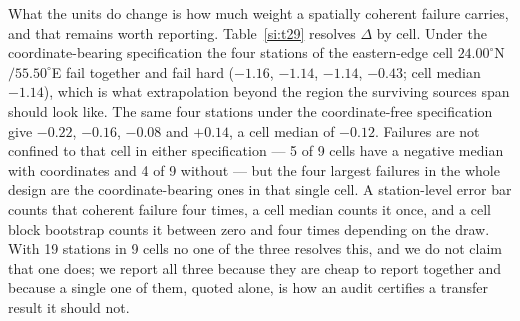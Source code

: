 \documentclass[11pt]{article}
\begin{document}
What the units do change is how much weight a spatially coherent failure carries, and that
remains worth reporting. Table~\ref{si:t29} resolves $\Delta$ by cell. Under the coordinate-bearing
specification the four stations of the eastern-edge cell $24.00^\circ$N$/55.50^\circ$E fail
together and fail hard ($-1.16$, $-1.14$, $-1.14$, $-0.43$; cell median $-1.14$), which is
what extrapolation beyond the region the surviving sources span should look like. The same
four stations under the coordinate-free specification give $-0.22$, $-0.16$, $-0.08$ and
$+0.14$, a cell median of $-0.12$. Failures are not confined to that cell in either
specification --- 5 of 9 cells have a negative median with coordinates and 4 of 9 without
--- but the four largest failures in the whole design are the coordinate-bearing ones in
that single cell. A station-level error bar counts that coherent failure four times, a
cell median counts it once, and a cell block bootstrap counts it between zero and four
times depending on the draw. With 19 stations in 9 cells no one of the three resolves this,
and we do not claim that one does; we report all three because they are cheap to report
together and because a single one of them, quoted alone, is how an audit certifies a
transfer result it should not.
\end{document}
